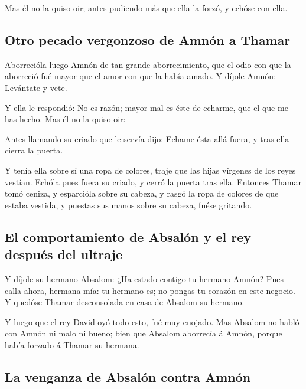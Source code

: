  Mas él no la quiso oir; antes pudiendo más que ella la
forzó, y echóse con ella.

\hypertarget{otro-pecado-vergonzoso-de-amnuxf3n-a-thamar}{%
\subsection{Otro pecado vergonzoso de Amnón a
Thamar}\label{otro-pecado-vergonzoso-de-amnuxf3n-a-thamar}}

 Aborrecióla luego Amnón de tan grande aborrecimiento, que
el odio con que la aborreció fué mayor que el amor con que la había
amado. Y díjole Amnón: Levántate y vete.

 Y ella le respondió: No es razón; mayor mal es éste de
echarme, que el que me has hecho. Mas él no la quiso oir:

 Antes llamando su criado que le servía dijo: Echame ésta
allá fuera, y tras ella cierra la puerta.

 Y tenía ella sobre sí una ropa de colores, traje que las
hijas vírgenes de los reyes vestían. Echóla pues fuera su criado, y
cerró la puerta tras ella.  Entonces Thamar tomó ceniza, y
esparcióla sobre su cabeza, y rasgó la ropa de colores de que estaba
vestida, y puestas sus manos sobre su cabeza, fuése gritando.

\hypertarget{el-comportamiento-de-absaluxf3n-y-el-rey-despuuxe9s-del-ultraje}{%
\subsection{El comportamiento de Absalón y el rey después del
ultraje}\label{el-comportamiento-de-absaluxf3n-y-el-rey-despuuxe9s-del-ultraje}}

 Y díjole su hermano Absalom: ¿Ha estado contigo tu hermano
Amnón? Pues calla ahora, hermana mía: tu hermano es; no pongas tu
corazón en este negocio. Y quedóse Thamar desconsolada en casa de
Absalom su hermano.

 Y luego que el rey David oyó todo esto, fué muy enojado.
 Mas Absalom no habló con Amnón ni malo ni bueno; bien que
Absalom aborrecía á Amnón, porque había forzado á Thamar su hermana.

\hypertarget{la-venganza-de-absaluxf3n-contra-amnuxf3n}{%
\subsection{La venganza de Absalón contra
Amnón}\label{la-venganza-de-absaluxf3n-contra-amnuxf3n}}

